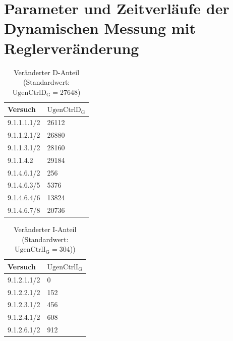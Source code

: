 \section{Parameter und Zeitverläufe der Dynamischen Messung mit Reglerveränderung}
\label{sec:ReglerparameterDynamischeMessung}

\begin{longtable}[]{ll}
    \caption{Veränderter D-Anteil (Standardwert: $\mathrm{UgenCtrlD_G}=27648$)}
    \label{tab:Parameter-D-Messung}
    \tabularnewline
    \toprule
    Versuch     & $\mathrm{UgenCtrlD_G}$ \\
    \midrule
    \endhead
    9.1.1.1.1/2 & 26112        \\
    9.1.1.2.1/2 & 26880        \\
    9.1.1.3.1/2 & 28160        \\
    9.1.1.4.2 & 29184        \\
    9.1.4.6.1/2 & 256          \\
    9.1.4.6.3/5 & 5376         \\
    9.1.4.6.4/6 & 13824        \\
    9.1.4.6.7/8 & 20736        \\
    \bottomrule
\end{longtable}

\begin{longtable}[]{ll}
    \caption{Veränderter I-Anteil (Standardwert: $\mathrm{UgenCtrlI_G}=304$))}
    \label{tab:Parameter-I-Messung}
    \tabularnewline
    \toprule
    Versuch     & $\mathrm{UgenCtrlI_G}$ \\
    \midrule
    \endhead
        9.1.2.1.1/2 & 0            \\
        9.1.2.2.1/2 & 152          \\
        9.1.2.3.1/2 & 456          \\
        9.1.2.4.1/2 & 608          \\
        9.1.2.6.1/2 & 912          \\
    \bottomrule
\end{longtable}

